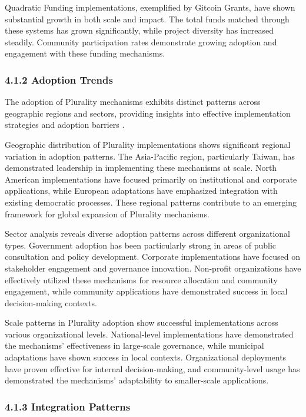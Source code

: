 Quadratic Funding implementations, exemplified by Gitcoin Grants, have shown substantial growth in both scale and impact. The total funds matched through these systems has grown significantly, while project diversity has increased steadily. Community participation rates demonstrate growing adoption and engagement with these funding mechanisms.

\hypertarget{adoption-trends}{%
\subsubsection{4.1.2 Adoption Trends}\label{adoption-trends}}

The adoption of Plurality mechanisms exhibits distinct patterns across geographic regions and sectors, providing insights into effective implementation strategies and adoption barriers \citep{vtaiwan2023}.

Geographic distribution of Plurality implementations shows significant regional variation in adoption patterns. The Asia-Pacific region, particularly Taiwan, has demonstrated leadership in implementing these mechanisms at scale. North American implementations have focused primarily on institutional and corporate applications, while European adaptations have emphasized integration with existing democratic processes. These regional patterns contribute to an emerging framework for global expansion of Plurality mechanisms.

Sector analysis reveals diverse adoption patterns across different organizational types. Government adoption has been particularly strong in areas of public consultation and policy development. Corporate implementations have focused on stakeholder engagement and governance innovation. Non-profit organizations have effectively utilized these mechanisms for resource allocation and community engagement, while community applications have demonstrated success in local decision-making contexts.

Scale patterns in Plurality adoption show successful implementations across various organizational levels. National-level implementations have demonstrated the mechanisms' effectiveness in large-scale governance, while municipal adaptations have shown success in local contexts. Organizational deployments have proven effective for internal decision-making, and community-level usage has demonstrated the mechanisms' adaptability to smaller-scale applications.

\hypertarget{integration-patterns}{%
\subsubsection{4.1.3 Integration Patterns}\label{integration-patterns}}

